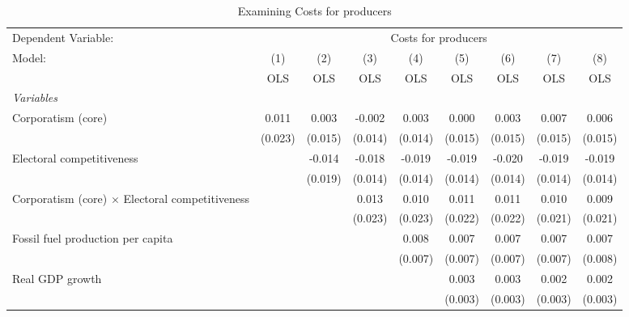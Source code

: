 
\begin{table}[htbp]
   \caption{Examining Costs for producers}
   \centering
   \begin{tabular}{lcccccccc}
      \toprule
      Dependent Variable: & \multicolumn{8}{c}{Costs for producers}\\
      Model:                                                 & (1)     & (2)     & (3)     & (4)     & (5)     & (6)     & (7)     & (8)\\  
                                                             &  OLS    & OLS     & OLS     & OLS     & OLS     & OLS     & OLS     & OLS\\  
      \midrule
      \emph{Variables}\\
      Corporatism (core)                                     & 0.011   & 0.003   & -0.002  & 0.003   & 0.000   & 0.003   & 0.007   & 0.006\\   
                                                             & (0.023) & (0.015) & (0.014) & (0.014) & (0.015) & (0.015) & (0.015) & (0.015)\\   
      Electoral competitiveness                              &         & -0.014  & -0.018  & -0.019  & -0.019  & -0.020  & -0.019  & -0.019\\   
                                                             &         & (0.019) & (0.014) & (0.014) & (0.014) & (0.014) & (0.014) & (0.014)\\   
      Corporatism (core) $\times$ Electoral competitiveness  &         &         & 0.013   & 0.010   & 0.011   & 0.011   & 0.010   & 0.009\\   
                                                             &         &         & (0.023) & (0.023) & (0.022) & (0.022) & (0.021) & (0.021)\\   
      Fossil fuel production per capita                      &         &         &         & 0.008   & 0.007   & 0.007   & 0.007   & 0.007\\   
                                                             &         &         &         & (0.007) & (0.007) & (0.007) & (0.007) & (0.008)\\   
      Real GDP growth                                        &         &         &         &         & 0.003   & 0.003   & 0.002   & 0.002\\   
                                                             &         &         &         &         & (0.003) & (0.003) & (0.003) & (0.003)\\   

\end{tabular}
\end{table}
